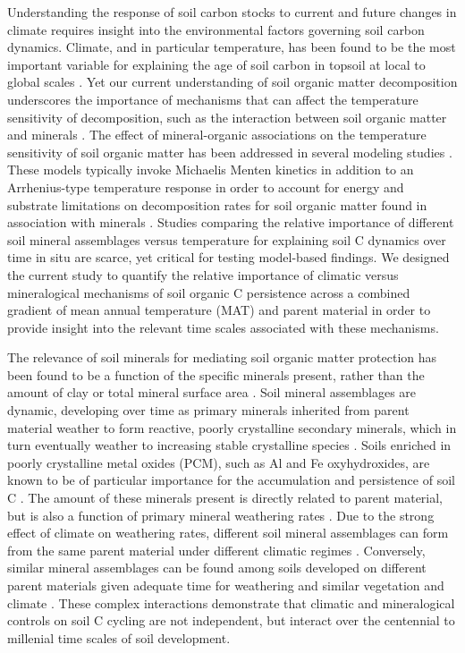 \documentclass[soil, manuscript]{copernicus}
\begin{document}
Understanding the response of soil carbon stocks to current and future
changes in climate requires insight into the environmental factors
governing soil carbon dynamics. Climate, and in particular temperature,
has been found to be the most important variable for explaining the age
of soil carbon in topsoil at local to global scales
\citep{frank2012, mathieu2015, shi2020}. Yet our current understanding
of soil organic matter decomposition underscores the importance of
mechanisms that can affect the temperature sensitivity of decomposition,
such as the interaction between soil organic matter and minerals
\citep{davidson2000, davidson2006, rasmussen2005, lehmann2015}. The
effect of mineral-organic associations on the temperature sensitivity of
soil organic matter has been addressed in several modeling studies
\citep{ahrens2020, woolf2019, abramoff2019, tang2014}. These models
typically invoke Michaelis Menten kinetics in addition to an
Arrhenius-type temperature response in order to account for energy and
substrate limitations on decomposition rates for soil organic matter
found in association with minerals \citep{tang2019, ahrens2020}. Studies
comparing the relative importance of different soil mineral assemblages
versus temperature for explaining soil C dynamics over time in situ are
scarce, yet critical for testing model-based findings. We designed the
current study to quantify the relative importance of climatic versus
mineralogical mechanisms of soil organic C persistence across a combined
gradient of mean annual temperature (MAT) and parent material in order
to provide insight into the relevant time scales associated with these
mechanisms.

The relevance of soil minerals for mediating soil organic matter
protection has been found to be a function of the specific minerals
present, rather than the amount of clay or total mineral surface area
\citep{rasmussen2018a, kramer2018}. Soil mineral assemblages are
dynamic, developing over time as primary minerals inherited from parent
material weather to form reactive, poorly crystalline secondary
minerals, which in turn eventually weather to increasing stable
crystalline species \citep{slessarev2022, mikutta2010}. Soils enriched
in poorly crystalline metal oxides (PCM), such as Al and Fe
oxyhydroxides, are known to be of particular importance for the
accumulation and persistence of soil C \citep{torn1997, masiello2004}.
The amount of these minerals present is directly related to parent
material, but is also a function of primary mineral weathering rates
\citep{slessarev2022}. Due to the strong effect of climate on weathering
rates, different soil mineral assemblages can form from the same parent
material under different climatic regimes
\citep{rasmussen2018b, kramer2016}. Conversely, similar mineral
assemblages can be found among soils developed on different parent
materials given adequate time for weathering and similar vegetation and
climate \citep{graham2010}. These complex interactions demonstrate that
climatic and mineralogical controls on soil C cycling are not
independent, but interact over the centennial to millenial time scales
of soil development.
\end{document}
